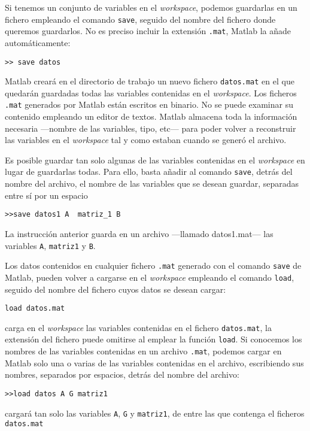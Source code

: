 Si tenemos un conjunto de variables en el \emph{workspace}, podemos guardarlas en un fichero empleando el comando \texttt{save}, seguido del nombre del fichero donde queremos guardarlos. No es preciso incluir la extensión \texttt{.mat}, Matlab la añade automáticamente:
\begin{verbatim}
>> save datos
\end{verbatim}
Matlab creará en el directorio de trabajo un nuevo fichero \texttt{datos.mat} en el que quedarán guardadas todas las variables contenidas en el \emph{workspace}.  Los ficheros \texttt{.mat} generados por Matlab están escritos en binario. No se puede examinar su contenido empleando un editor de textos. Matlab almacena toda la información necesaria ---nombre de las variables, tipo, etc--- para poder volver a reconstruir las variables en el \emph{workspace} tal y como estaban cuando se generó el archivo.


Es posible guardar tan solo algunas de las variables contenidas en el \emph{workspace} en lugar de guardarlas todas. Para ello, basta añadir al comando \texttt{save}, detrás del nombre del archivo, el nombre de las variables que se desean guardar, separadas entre sí por un espacio
\begin{verbatim}
>>save datos1 A  matriz_1 B 
\end{verbatim}
La instrucción anterior guarda en un archivo ---llamado datos1.mat--- las variables \texttt{A}, \texttt{matriz1} y \texttt{B}.


Los datos contenidos en cualquier fichero \texttt{.mat} generado con el comando \texttt{save} de Matlab, pueden volver a cargarse en el \emph{workspace} empleando el comando \texttt{load}, seguido del nombre del fichero cuyos datos se desean cargar:
\begin{verbatim}
load datos.mat
\end{verbatim}
 carga en el \emph{workspace} las variables contenidas en el fichero \texttt{datos.mat}, la extensión del fichero puede omitirse al emplear la función \texttt{load}. Si conocemos los nombres de las variables contenidas en un archivo \texttt{.mat}, podemos cargar en Matlab solo una o varias de las variables contenidas en el archivo, escribiendo sus nombres, separados por espacios, detrás del nombre del archivo: 
\begin{verbatim}
>>load datos A G matriz1
\end{verbatim}
 cargará tan solo las variables \texttt{A}, \texttt{G} y \texttt{matriz1}, de entre las que contenga el ficheros \texttt{datos.mat}

